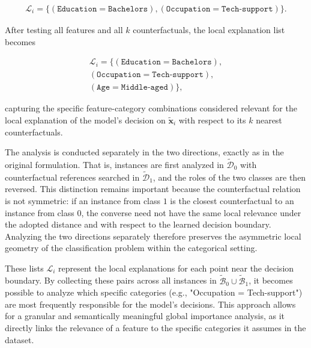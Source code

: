 \begin{equation}
  \begin{aligned}
    \mathcal{L}_i = \{(\texttt{Education}=\texttt{Bachelors}), (\texttt{Occupation}=\texttt{Tech-support})\}.
  \end{aligned}
\end{equation}

After testing all features and all $k$ counterfactuals, the local explanation list becomes

\begin{equation}
  \begin{aligned}
    \mathcal{L}_i = \{(\texttt{Education}=\texttt{Bachelors}),\\ 
    (\texttt{Occupation}=\texttt{Tech-support}),\\ 
    (\texttt{Age}=\texttt{Middle-aged})\},
  \end{aligned}
\end{equation}

capturing the specific feature-category combinations considered relevant for the local explanation of the model's decision on $\tilde{\mathbf{x}}_i$ with respect to its $k$ nearest counterfactuals.

The analysis is conducted separately in the two directions, exactly as in the original formulation. That is, instances are first analyzed in $\widetilde{\mathcal{D}}_{0}$ with counterfactual references searched in $\widetilde{\mathcal{D}}_{1}$, and the roles of the two classes are then reversed. This distinction remains important because the counterfactual relation is not symmetric: if an instance from class $1$ is the closest counterfactual to an instance from class $0$, the converse need not have the same local relevance under the adopted distance and with respect to the learned decision boundary. Analyzing the two directions separately therefore preserves the asymmetric local geometry of the classification problem within the categorical setting.

These lists $\mathcal{L}_i$ represent the local explanations for each point near the decision boundary. By collecting these pairs across all instances in $\widetilde{\mathcal{B}}_0 \cup \widetilde{\mathcal{B}}_1$, it becomes possible to analyze which specific categories (e.g., "Occupation = Tech-support") are most frequently responsible for the model's decisions. This approach allows for a granular and semantically meaningful global importance analysis, as it directly links the relevance of a feature to the specific categories it assumes in the dataset.


